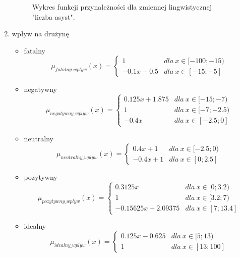 \documentclass{classrep}
\begin{document}
\begin{enumerate}
\begin{figure}[H]
        \caption{Wykres funkcji przynależności dla zmiennej lingwistycznej "liczba asyst".}
        \label{rysunek:asysty}
    \end{figure}
    \item wpływ na drużynę
    \begin{itemize}
        \item fatalny
        \begin{equation}
            \mu_{fatalny\_wplyw}(x) = \left\{\begin{matrix} 1 & dla \: x\in[-100;-15) \\ -0.1x - 0.5 & dla \: x\in [-15; -5] \end{matrix}\right.
        \end{equation}
         \item negatywny
        \begin{equation}
            \mu_{negatywny\_wplyw}(x) = \left\{\begin{matrix} 0.125x + 1.875 & dla \: x\in[-15;-7) \\ 1 & dla \: x\in [-7;-2.5) \\ -0.4x & dla \: x\in [-2.5; 0] \end{matrix}\right.
        \end{equation}
        \item neutralny
        \begin{equation}
            \mu_{neutralny\_wplyw}(x) = \left\{\begin{matrix} 0.4x + 1 & dla \: x\in[-2.5;0) \\ -0.4x + 1 & dla \: x\in [0; 2.5] \end{matrix}\right.
        \end{equation}
        \item pozytywny
        \begin{equation}
            \mu_{pozytywny\_wplyw}(x) = \left\{\begin{matrix} 0.3125x & dla \: x\in[0;3.2) \\ 1 & dla \: x\in [3.2;7) \\ -0.15625x + 2.09375 & dla \: x\in [7; 13.4] \end{matrix}\right.
        \end{equation}
        \item idealny
        \begin{equation}
            \mu_{idealny\_wplyw}(x) = \left\{\begin{matrix} 0.125x - 0.625 & dla \: x\in[5;13) \\ 1 & dla \: x\in [13;100] \end{matrix}\right.

\end{equation}
\end{itemize}
\end{enumerate}
\end{document}
